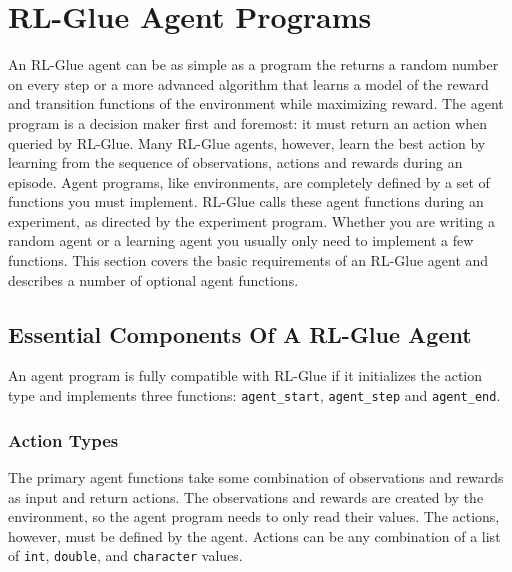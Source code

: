 \documentclass[11pt]{article}
\begin{document}

\section{RL-Glue Agent Programs}
\label{agent}
An RL-Glue agent can be as simple as a program the returns a random number on every step or a more advanced algorithm that learns a model of the reward and transition functions of the environment while maximizing reward. The agent program is a decision maker first and foremost: it must return an action when queried by RL-Glue. Many RL-Glue agents, however, learn the best action by learning from the sequence of observations, actions and rewards during an episode. Agent programs, like environments, are completely defined by a set of functions you must implement. RL-Glue calls these agent functions during an experiment, as directed by the experiment program. Whether you are writing a random agent or a learning agent you usually only need  to implement a few functions. This section covers the basic requirements of an RL-Glue agent and describes a number of optional agent functions.
\subsection{Essential Components Of A RL-Glue Agent}
\label{agentp1}

An agent program is fully compatible with RL-Glue if it initializes the action type and implements three functions: \texttt{agent\_start}, \texttt{agent\_step} and \texttt{agent\_end}. 

\subsubsection{Action Types}
The primary agent functions take some combination of observations and rewards as input and return actions. The observations and rewards are created by the environment, so the agent program needs to only read their values. The actions, however, must be defined by the agent. Actions can be any combination of a list of \texttt{int}, \texttt{double}, and \texttt{character} values.
\end{document}
